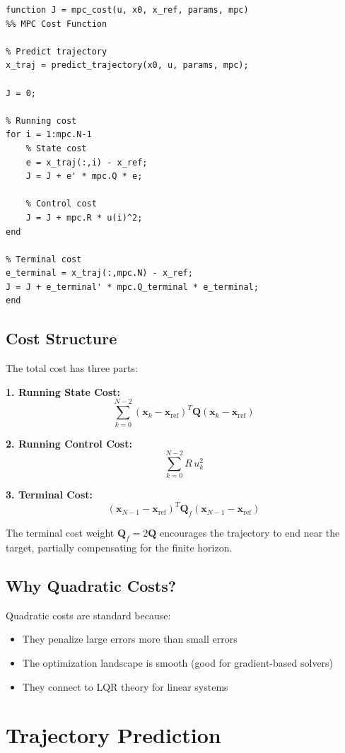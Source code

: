 \documentclass[11pt]{article}
\begin{document}
\begin{lstlisting}
function J = mpc_cost(u, x0, x_ref, params, mpc)
%% MPC Cost Function

% Predict trajectory
x_traj = predict_trajectory(x0, u, params, mpc);

J = 0;

% Running cost
for i = 1:mpc.N-1
    % State cost
    e = x_traj(:,i) - x_ref;
    J = J + e' * mpc.Q * e;

    % Control cost
    J = J + mpc.R * u(i)^2;
end

% Terminal cost
e_terminal = x_traj(:,mpc.N) - x_ref;
J = J + e_terminal' * mpc.Q_terminal * e_terminal;
end
\end{lstlisting}

\subsection{Cost Structure}

The total cost has three parts:

\textbf{1. Running State Cost:}
\[
\sum_{k=0}^{N-2} (\mathbf{x}_k - \mathbf{x}_{\text{ref}})^T \mathbf{Q} (\mathbf{x}_k - \mathbf{x}_{\text{ref}})
\]

\textbf{2. Running Control Cost:}
\[
\sum_{k=0}^{N-2} R \, u_k^2
\]

\textbf{3. Terminal Cost:}
\[
(\mathbf{x}_{N-1} - \mathbf{x}_{\text{ref}})^T \mathbf{Q}_f (\mathbf{x}_{N-1} - \mathbf{x}_{\text{ref}})
\]

The terminal cost weight $\mathbf{Q}_f = 2\mathbf{Q}$ encourages the trajectory to end near the target, partially compensating for the finite horizon.

\subsection{Why Quadratic Costs?}

Quadratic costs are standard because:
\begin{itemize}
    \item They penalize large errors more than small errors
    \item The optimization landscape is smooth (good for gradient-based solvers)
    \item They connect to LQR theory for linear systems
\end{itemize}

\section{Trajectory Prediction}
\end{document}
